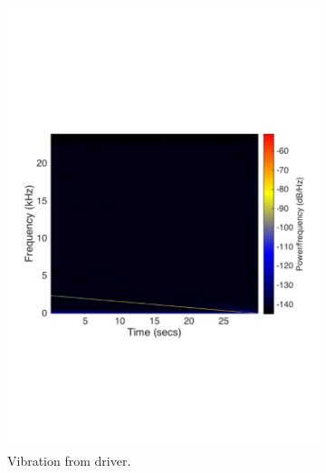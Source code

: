 \begin{figure}[H]
\centering
\begin{subfigure}[t]{0.47\textwidth}
	\includegraphics[width=1\textwidth]{figures/spectrogram_driver1.pdf}
	\caption{Vibration from driver.}
	\label{fig:spectrogram_driver1}
\end{subfigure}
\begin{subfigure}[t]{0.47\textwidth}

\end{subfigure}
\end{figure}

